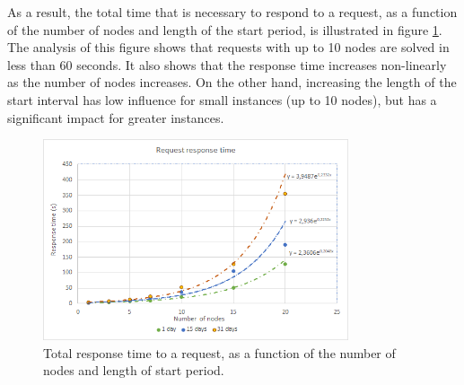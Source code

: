 As a result, the total time that is necessary to respond to a request, as a function of the number of nodes and length of the start period, is illustrated in figure \ref{fig:response_time}. The analysis of this figure shows that requests with up to 10 nodes are solved in less than 60 seconds. It also shows that the response time increases non-linearly as the number of nodes increases. On the other hand, increasing the length of the start interval has low influence for small instances (up to 10 nodes), but has a significant impact for greater instances.

\begin{figure}
  \centering
  \includegraphics[width=9cm]{./imgs/response_time.png}
  \caption{Total response time to a request, as a function of the number of nodes and length of start period.}
  \label{fig:response_time}  
\end{figure}










